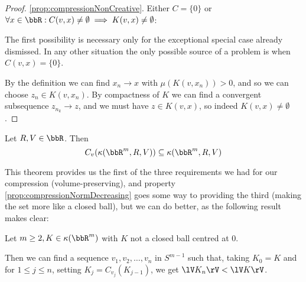 \documentclass[a4paper,11pt]{article}
\begin{document}
\begin{proof}
\ref{prop:compressionNonCreative}. Either $C=\{0\}$ or
	$\forall x\in\bbR:C(v,x)\not=\emptyset\implies K(v,x)\not=\emptyset$:

The first possibility is necessary only for the exceptional special case
already dismissed.  In any other situation the only possible source of a
problem is when $C(v,x)=\{0\}$.

By the definition we can find $x_n\to x$ with $\mu(K(v,x_n))>0$, and so we can
choose $z_n\in K(v,x_n)$.  By compactness of $K$ we can find a convergent
subsequence $z_{n_k}\to z$, and we must have $z\in K(v,x)$, so indeed
$K(v,x)\not=\emptyset$.
\end{proof}

\begin{corollary}
\label{thm:compressionNice}
Let $R,V\in\bbR$.  Then
\[
C_v(\kappa(\bbR^m,R,V))\subseteq\kappa(\bbR^m,R,V)
\]
\end{corollary}

This theorem provides us the first of the three requirements we had for our
compression (volume-preserving),
and property \ref{prop:compressionNormDecreasing} goes some way to
providing the third (making the set more like a closed ball),
but we can do better, as the following result makes clear:

\begin{thm}
\label{thm:compressionStrictlyNormDecreasing}
Let $m\geq2, K\in\kappa(\bbR^m)$ with $K$ not a closed ball centred at $0$.

Then we can find a sequence $v_1,v_2,\ldots,v_n$
in $S^{m-1}$ such that, taking $K_0=K$ and for $1\leq j\leq n$, setting
$K_j=C_{v_j}(K_{j-1})$, we get $\lV K_n\rV<\lV K\rV$.
\end{thm}
\end{document}
